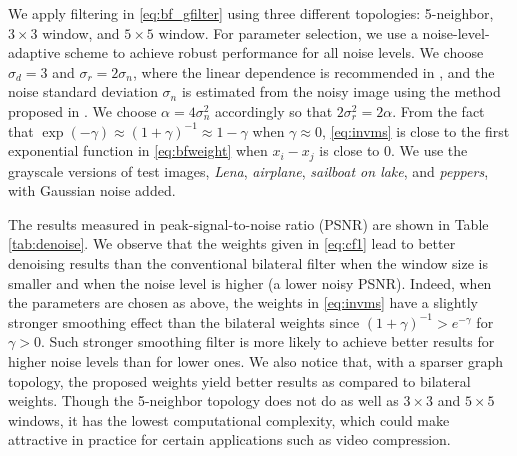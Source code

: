 \documentclass{article}
\begin{document}
% 
% 
We apply filtering in \eqref{eq:bf_gfilter} using three different topologies: 5-neighbor, $3\times 3$ window, and $5\times 5$ window. For parameter selection, we use a noise-level-adaptive scheme to achieve robust performance for all noise levels. We choose $\sigma_d=3$ and $\sigma_r=2\sigma_n$, where the linear dependence is recommended in \cite{Liu2006}, and the noise standard deviation $\sigma_n$ is estimated from the noisy image using the method proposed in \cite{Immerkaer1996}. We choose $\alpha=4\sigma_n^2$ accordingly so that $2\sigma_r^2=2\alpha$. From the fact that $\exp(-\gamma)\approx(1+\gamma)^{-1}\approx 1-\gamma$ when $\gamma\approx 0$, \eqref{eq:invms} is close to the first exponential function in \eqref{eq:bfweight} when $x_i-x_j$ is close to 0. We use the grayscale versions of test images, {\it Lena}, {\it airplane}, {\it sailboat on lake}, and {\it peppers}, with Gaussian noise added. 

The results measured in peak-signal-to-noise ratio (PSNR) are shown in Table \ref{tab:denoise}. We observe that the weights given in \eqref{eq:cf1} lead to better denoising results than the conventional bilateral filter when the window size is smaller and when the noise level is higher (a lower noisy PSNR). Indeed, when the parameters are chosen as above, the weights in \eqref{eq:invms} have a slightly stronger smoothing effect than the bilateral weights since $(1+\gamma)^{-1}>e^{-\gamma}$ for $\gamma>0$. Such stronger smoothing filter is more likely to achieve better results for higher noise levels than for lower ones. We also notice that, with a sparser graph topology, the proposed weights yield better results as compared to bilateral weights. Though the 5-neighbor topology does not do as well as $3\times 3$ and $5\times 5$ windows, it has the lowest computational complexity, which could make attractive in practice for certain applications such as video compression.
% 
% 
\end{document}
